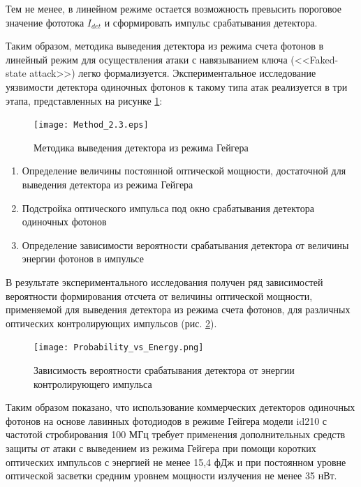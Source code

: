 Тем не менее, в линейном режиме остается возможность превысить пороговое значение фототока $I_{det}$ и сформировать импульс срабатывания детектора.

Таким образом, методика выведения детектора из режима счета фотонов в линейный режим для осуществления атаки с навязыванием ключа (<<Faked-state attack>>) легко формализуется. Экспериментальное исследование уязвимости детектора одиночных фотонов к такому типа атак реализуется в три этапа, представленных на рисунке \ref{fig:Method_2.3}:
%
 \begin{figure}[ht] 
  \centering
  \texttt{[image: Method\_2.3.eps]}
  \caption{Методика выведения детектора из режима Гейгера}
  \label{fig:Method_2.3}
\end{figure}
%
 \begin{enumerate}
	\item Определение величины постоянной оптической мощности, достаточной для выведения детектора из режима Гейгера
	\item Подстройка оптического импульса под окно срабатывания детектора одиночных фотонов
	\item Определение зависимости вероятности срабатывания детектора от величины энергии фотонов в импульсе
\end{enumerate}
%
В результате экспериментального исследования получен ряд зависимостей вероятности формирования отсчета от величины оптической мощности, применяемой для выведения детектора из режима счета фотонов, для различных оптических контролирующих импульсов (рис. \ref{fig:Probability_vs_Energy}). 

\begin{figure}[ht]
  \centering
  \texttt{[image: Probability\_vs\_Energy.png]}
  \caption{Зависимость вероятности срабатывания детектора от энергии контролирующего импульса}
  \label{fig:Probability_vs_Energy}
\end{figure}


Таким образом показано, что использование коммерческих детекторов одиночных фотонов на основе лавинных фотодиодов в режиме Гейгера модели id210 с частотой стробирования 100 МГц  требует применения дополнительных средств защиты от атаки с выведением из режима Гейгера при помощи коротких оптических импульсов с энергией не менее 15,4 фДж и при постоянном уровне оптической засветки средним уровнем мощности излучения не менее 35 нВт.  

